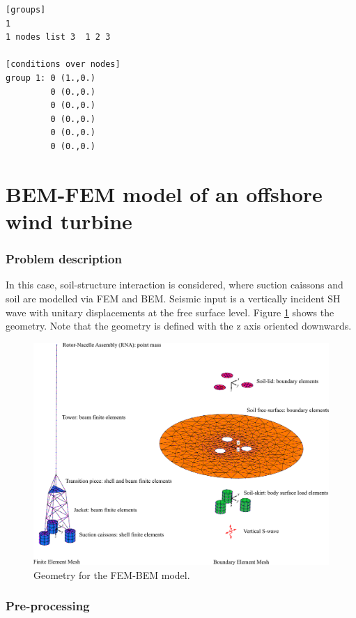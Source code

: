 \documentclass[a4]{article}
\begin{document}
\begin{Verbatim}
[groups]
1
1 nodes list 3  1 2 3 

[conditions over nodes]
group 1: 0 (1.,0.)
         0 (0.,0.)
         0 (0.,0.)
         0 (0.,0.)
         0 (0.,0.)
         0 (0.,0.)
\end{Verbatim}

\part{BEM-FEM model of an offshore wind turbine}

\section{Problem description}

In this case, soil-structure interaction is considered, where suction caissons and soil are modelled via FEM and BEM. Seismic input is a vertically incident SH wave with unitary displacements at the free surface level. Figure \ref{fig:geometry2} shows the geometry. Note that the geometry is defined with the z axis oriented downwards.

\begin{figure}[tbh!]
	\centering
	\includegraphics[scale=0.35]{owt_model_flexible.pdf}
	\caption{Geometry for the FEM-BEM model.}
	\label{fig:geometry2}
\end{figure}

\section{Pre-processing}
\end{document}
